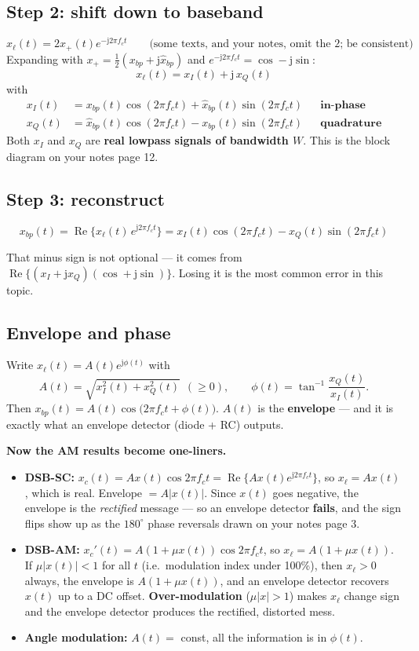 \documentclass[11pt,a4paper]{article}
\newcommand{\ii}{\mathrm{j}}
\begin{document}
\subsection{Step 2: shift down to baseband}
\[
x_\ell(t)=2x_+(t)e^{-\ii2\pi f_ct}
\qquad\text{(some texts, and your notes, omit the 2; be consistent)}
\]
Expanding with $x_+=\frac12(x_{bp}+\ii\hat x_{bp})$ and $e^{-\ii2\pi f_ct}=\cos-\ii\sin$:
\[
x_\ell(t)=x_I(t)+\ii\,x_Q(t)
\]
with
\begin{align}
x_I(t)&=x_{bp}(t)\cos(2\pi f_ct)+\hat x_{bp}(t)\sin(2\pi f_ct) &&\textbf{in-phase}\\
x_Q(t)&=\hat x_{bp}(t)\cos(2\pi f_ct)-x_{bp}(t)\sin(2\pi f_ct) &&\textbf{quadrature}
\end{align}
Both $x_I$ and $x_Q$ are \textbf{real lowpass signals of bandwidth $W$}. This is the block diagram on your
notes page 12.

\subsection{Step 3: reconstruct}
\begin{keybox}
\[
\boxed{\;x_{bp}(t)=\operatorname{Re}\big\{x_\ell(t)\,e^{\ii2\pi f_ct}\big\}
= x_I(t)\cos(2\pi f_ct)-x_Q(t)\sin(2\pi f_ct)\;}
\]
\end{keybox}
That minus sign is not optional --- it comes from $\operatorname{Re}\{(x_I+\ii x_Q)(\cos+\ii\sin)\}$. Losing
it is the most common error in this topic.

\subsection{Envelope and phase}
Write $x_\ell(t)=A(t)e^{\ii\phi(t)}$ with
\[
A(t)=\sqrt{x_I^2(t)+x_Q^2(t)}\ \ (\ge0),
\qquad
\phi(t)=\tan^{-1}\!\frac{x_Q(t)}{x_I(t)} .
\]
Then $x_{bp}(t)=A(t)\cos\big(2\pi f_ct+\phi(t)\big)$. $A(t)$ is the \textbf{envelope} --- and it is exactly
what an envelope detector (diode + RC) outputs.

\begin{keybox}
\textbf{Now the AM results become one-liners.}
\begin{itemize}[nosep,leftmargin=*]
\item \textbf{DSB-SC:} $x_c(t)=Ax(t)\cos2\pi f_ct=\operatorname{Re}\{Ax(t)e^{\ii2\pi f_ct}\}$, so
$x_\ell=Ax(t)$, which is real. Envelope $=A|x(t)|$. Since $x(t)$ goes negative, the envelope is the
\emph{rectified} message --- so an envelope detector \textbf{fails}, and the sign flips show up as the
$180^\circ$ phase reversals drawn on your notes page 3.
\item \textbf{DSB-AM:} $x_c'(t)=A(1+\mu x(t))\cos2\pi f_ct$, so $x_\ell=A(1+\mu x(t))$. If $\mu|x(t)|<1$ for
all $t$ (i.e.\ modulation index under 100\%), then $x_\ell>0$ always, the envelope is
$A(1+\mu x(t))$, and an envelope detector recovers $x(t)$ up to a DC offset. \textbf{Over-modulation}
($\mu|x|>1$) makes $x_\ell$ change sign and the envelope detector produces the rectified, distorted mess.
\item \textbf{Angle modulation:} $A(t)=$ const, all the information is in $\phi(t)$.
\end{itemize}
\end{keybox}
\end{document}
